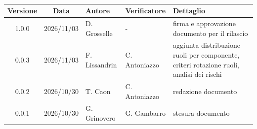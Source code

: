 \\[0.5cm]

\renewcommand{\arraystretch}{1.3}
\noindent\begin{tabularx}{\textwidth}{|c|c|>{\raggedright\arraybackslash}p{2.8cm}|>{\raggedright\arraybackslash}p{2.8cm}|X|}
    \hline
    \textbf{Versione} & \textbf{Data} & \textbf{Autore} & \textbf{Verificatore} & \textbf{Dettaglio}                                                                       \\
    \hline
    1.0.0             & 2026/11/03    & D. Grosselle    & -                     & firma e approvazione documento per il rilascio                                           \\
    \hline
    0.0.3             & 2026/11/03    & F. Lissandrin   & C. Antoniazzo         & aggiunta distribuzione ruoli per componente, criteri rotazione ruoli, analisi dei rischi \\
    \hline
    0.0.2             & 2026/10/30    & T. Caon         & C. Antoniazzo         & redazione documento                                                                      \\
    \hline
    0.0.1             & 2026/10/30    & G. Grinovero    & G. Gambarro           & stesura documento                                                                        \\
    \hline
\end{tabularx}
\newpage